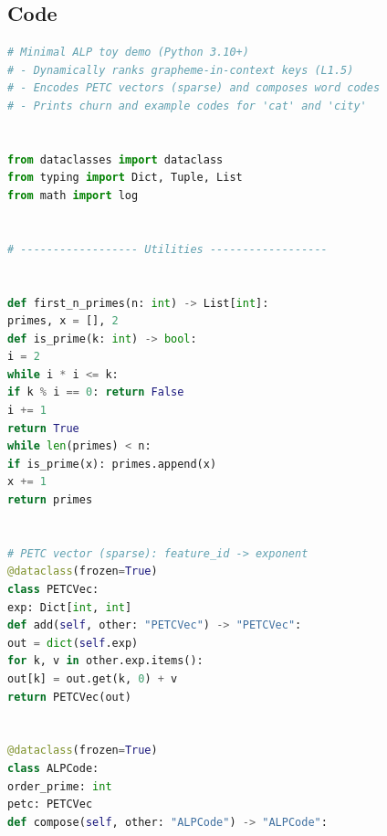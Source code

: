 \documentclass[11pt]{article}
\begin{document}
\subsection*{Code}
\begin{lstlisting}[language=Python]
# Minimal ALP toy demo (Python 3.10+)
# - Dynamically ranks grapheme-in-context keys (L1.5)
# - Encodes PETC vectors (sparse) and composes word codes
# - Prints churn and example codes for 'cat' and 'city'


from dataclasses import dataclass
from typing import Dict, Tuple, List
from math import log


# ------------------ Utilities ------------------


def first_n_primes(n: int) -> List[int]:
primes, x = [], 2
def is_prime(k: int) -> bool:
i = 2
while i * i <= k:
if k % i == 0: return False
i += 1
return True
while len(primes) < n:
if is_prime(x): primes.append(x)
x += 1
return primes


# PETC vector (sparse): feature_id -> exponent
@dataclass(frozen=True)
class PETCVec:
exp: Dict[int, int]
def add(self, other: "PETCVec") -> "PETCVec":
out = dict(self.exp)
for k, v in other.exp.items():
out[k] = out.get(k, 0) + v
return PETCVec(out)


@dataclass(frozen=True)
class ALPCode:
order_prime: int
petc: PETCVec
def compose(self, other: "ALPCode") -> "ALPCode":
\end{lstlisting}

\nocite{*}


\end{document}
